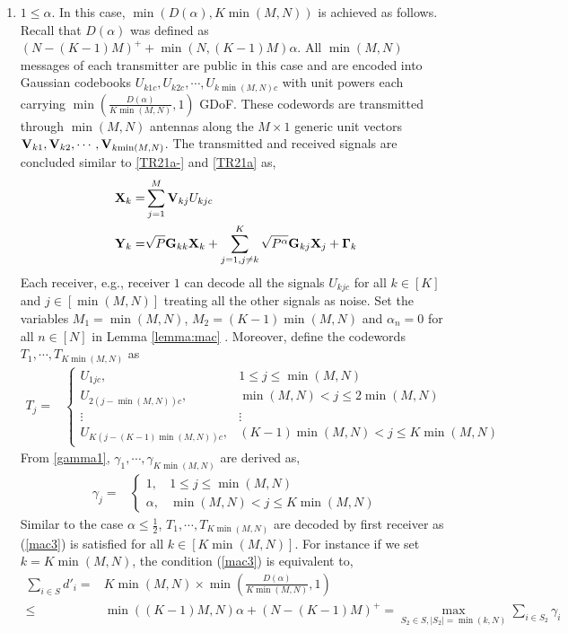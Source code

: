 \documentclass[11pt]{article}
\begin{document}
\begin{enumerate}
\item{$1\le\alpha$.} In this case, $\min\left(D(\alpha),K\min(M,N)\right)$ is achieved as follows. Recall that $D(\alpha)$ was defined as $(N-(K-1)M)^++\min(N,(K-1)M)\alpha$. All $\min(M,N)$ messages of each transmitter are
public in this case and are encoded into Gaussian codebooks
$U_{k1c},U_{k2c},\cdots,U_{k\min(M,N)c}$ with unit powers each carrying $\min\left(\frac{D(\alpha)}{K\min(M,N)},1\right)$ GDoF. These codewords are transmitted through $\min(M,N)$ antennas along the $M\times 1$ generic unit  vectors ${\bf V}_{k1},{\bf V}_{k2},\cdots,{\bf V}_{k{\min(M,N)}}$. The transmitted and received signals are concluded similar to \eqref{TR21a-} and \eqref{TR21a} as,
\begin{align}
\mathbf{X}_{k}=&\sum_{j=1}^{M}\mathbf{V}_{kj}{U}_{kjc}\label{TR21a-1}\\
\mathbf{Y}_{k}=&\sqrt{P}{\bf G}_{kk}\mathbf{X}_{k}+\sum_{j=1,j\neq k}^{K}\sqrt{P^{\alpha}}{\bf {G}}_{kj}\mathbf{X}_{j}+\mathbf{\Gamma}_{k}\label{TR21a1}
\end{align}
Each receiver, e.g., receiver $1$ can decode  all the signals $U_{kjc}$ for all $k\in[K]$ and $j\in[\min(M,N)]$  treating all the other signals as noise. Set the variables $M_1=\min(M,N)$, $M_2=(K-1)\min(M,N)$ and $\alpha_n=0$ for all $n\in[N]$ in Lemma \ref{lemma:mac} . Moreover, define the codewords $T_{1},\cdots,T_{K\min(M,N)}$ as 
\begin {align}
T_j=&\left\{
\begin{array}{ll} 
U_{1jc},&1\le j\le {\min(M,N)}\\ 
U_{2(j-\min(M,N))c},&\min(M,N)<j\le 2\min(M,N)\\
\vdots &\vdots\\
U_{K(j-(K-1)\min(M,N))c},&(K-1)\min(M,N)<j\le K\min(M,N)
\end{array}
\right.
\end{align}
From \eqref{gamma1}, $\gamma_1,\cdots,\gamma_{K\min(M,N)}$ are derived as,
\begin {align}
\gamma_j=&\left\{
\begin{array}{ll} 
1,&1\le j\le \min(M,N)\\ 
\alpha,&\min(M,N)< j\le K\min(M,N)
\end{array}
\right.\label{ffd2}
\end{align}
Similar to the case $\alpha\le \frac{1}{2}$, $T_1,\cdots,T_{K\min(M,N)}$ are decoded by  first receiver as (\ref{mac3}) is satisfied for all $k\in[K\min(M,N)]$. For instance if we set $k=K\min(M,N)$, the condition (\ref{mac3}) is equivalent to,
\begin{align}
\sum_{i\in S} d'_i=&K\min(M,N)\times\min\left(\frac{D(\alpha)}{K\min(M,N)},1\right)\nonumber\\
\le&\min\left((K-1)M,N\right)\alpha+\left(N-(K-1)M\right)^+=\max_{S_2\in S,|S_2|=\min(k,N)}\sum_{i\in S_2} \gamma_i 
\end{align}

\end{enumerate}
\end{document}
